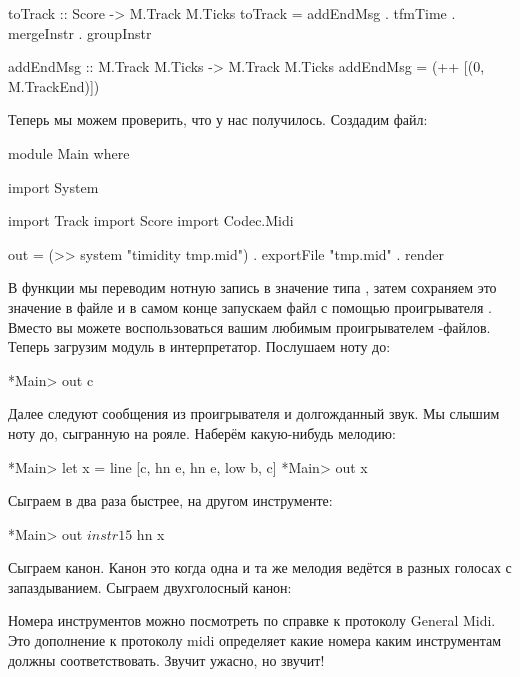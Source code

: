 \begin{code}
toTrack :: Score -> M.Track M.Ticks
toTrack = addEndMsg . tfmTime . mergeInstr . groupInstr

addEndMsg :: M.Track M.Ticks -> M.Track M.Ticks
addEndMsg = (++ [(0, M.TrackEnd)])
\end{code}

Теперь мы можем проверить, что у нас получилось. Создадим файл:


\begin{code}
module Main where

import System

import Track
import Score
import Codec.Midi

out = (>> system "timidity tmp.mid") . 
    exportFile "tmp.mid" . render
\end{code}

В функции  мы переводим нотную запись в значение типа ,
затем сохраняем это значение в файле  и в самом конце
запускаем файл с помощью проигрывателя . Вместо
 вы можете воспользоваться вашим любимым проигрывателем
-файлов. Теперь загрузим модуль  в интерпретатор.
Послушаем ноту до:


\begin{code}
*Main> out c
\end{code}

Далее следуют сообщения из проигрывателя  и долгожданный
звук. Мы слышим ноту до, сыгранную на рояле. Наберём какую-нибудь
мелодию:


\begin{code}
*Main> let x = line [c, hn e, hn e, low b, c]
*Main> out x
\end{code}

Сыграем в два раза быстрее, на другом инструменте:


\begin{code}
*Main> out $ instr 15 $ hn x
\end{code}

Сыграем канон. Канон это когда одна и та же мелодия ведётся в разных
голосах с запаздыванием. Сыграем двухголосный канон:



Номера инструментов можно посмотреть по справке к протоколу General
Midi. Это дополнение к протоколу midi определяет какие номера каким
инструментам должны соответствовать. Звучит ужасно, но звучит!

